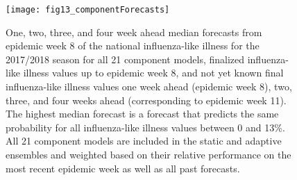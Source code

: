\documentclass[sagev,times,Review,10pt]{sagej}
\begin{document}
\begin{appendix}
\graphicspath{{../../../_6_TLGs/_G/fig13_exampleForecasts/}}
\begin{figure}[ht!]
    \centering
    \texttt{[image: fig13\_componentForecasts]}
    \caption{ One, two, three, and four week ahead median forecasts from epidemic week 8 of the national influenza-like illness for the 2017/2018 season for all 21 component models, finalized influenza-like illness values up to epidemic week 8, and not yet known final influenza-like illness values one week ahead (epidemic week 8), two, three, and four weeks ahead (corresponding to epidemic week 11).
      The highest median forecast is a forecast that predicts the same probability for all influenza-like illness values between 0 and 13\%.
      All 21 component models are included in the static and adaptive ensembles and weighted based on their relative performance on the most recent epidemic week as well as all past forecasts.
      \label{componentModelForecasts}}
\end{figure}



  
\end{appendix}
\end{document}

